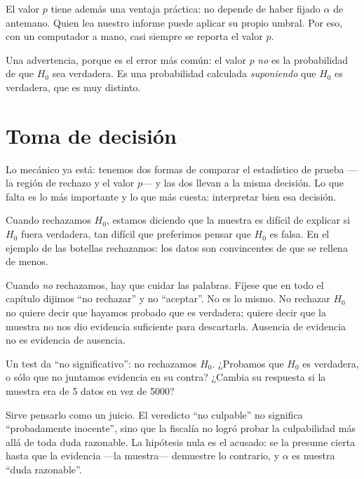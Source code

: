 El valor \(p\) tiene además una ventaja práctica: no depende de haber fijado \(\alpha\) de antemano. Quien lea nuestro informe puede aplicar su propio umbral. Por eso, con un computador a mano, casi siempre se reporta el valor \(p\).

Una advertencia, porque es el error más común: el valor \(p\) \emph{no} es la probabilidad de que \(H_0\) sea verdadera. Es una probabilidad calculada \emph{suponiendo} que \(H_0\) es verdadera, que es muy distinto.

\section{Toma de decisión}

Lo mecánico ya está: tenemos dos formas de comparar el estadístico de prueba —la región de rechazo y el valor \(p\)— y las dos llevan a la misma decisión. Lo que falta es lo más importante y lo que más cuesta: interpretar bien esa decisión.

Cuando rechazamos \(H_0\), estamos diciendo que la muestra es difícil de explicar si \(H_0\) fuera verdadera, tan difícil que preferimos pensar que \(H_0\) es falsa. En el ejemplo de las botellas rechazamos: los datos son convincentes de que se rellena de menos.

Cuando \emph{no} rechazamos, hay que cuidar las palabras. Fíjese que en todo el capítulo dijimos \enquote{no rechazar} y no \enquote{aceptar}. No es lo mismo. No rechazar \(H_0\) no quiere decir que hayamos probado que es verdadera; quiere decir que la muestra no nos dio evidencia suficiente para descartarla. Ausencia de evidencia no es evidencia de ausencia.

\begin{pausa}
Un test da \enquote{no significativo}: no rechazamos \(H_0\). ¿Probamos que \(H_0\) es verdadera, o sólo que no juntamos evidencia en su contra? ¿Cambia su respuesta si la muestra era de \num{5} datos en vez de \num{5000}?
\end{pausa}

Sirve pensarlo como un juicio. El veredicto \enquote{no culpable} no significa \enquote{probadamente inocente}, sino que la fiscalía no logró probar la culpabilidad más allá de toda duda razonable. La hipótesis nula es el acusado: se la presume cierta hasta que la evidencia —la muestra— demuestre lo contrario, y \(\alpha\) es nuestra \enquote{duda razonable}.

